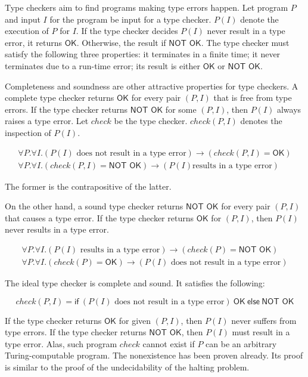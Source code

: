 Type checkers aim to find programs making type errors happen. Let program $P$ and
input $I$ for the program be input for a type checker. $P(I)$ denote the
execution of $P$ for $I$. If the type checker decides $P(I)$ never result in a
type error, it returns $\textsf{OK}$. Otherwise, the result if $\textsf{NOT OK}$.
The type checker must satisfy the following three properties: it terminates in a
finite time; it never terminates due to a run-time error; its result is either
$\textsf{OK}$ or $\textsf{NOT OK}$.

Completeness and soundness are other attractive properties for type checkers. A
complete type checker returns $\textsf{OK}$ for every pair $(P,I)$ that is free
from type errors. If the type checker returns $\textsf{NOT OK}$ for some $(P,I)$,
then $P(I)$ always raises a type error. Let $check$ be the type checker.
$check(P,I)$ denotes the inspection of $P(I)$.

\[
\begin{array}{l}
\forall P.\forall I.(P(I)\text{ does not result in a type
error})\rightarrow(\mathit{check}(P,I)=\textsf{OK}) \\
\forall P.\forall I.(\mathit{check}(P,I)=\textsf{NOT OK})\rightarrow(P(I)\text{
results in a type error})
\end{array}
\]

The former is the contrapositive of the latter.

On the other hand, a sound type checker returns $\textsf{NOT OK}$ for every pair
$(P,I)$ that causes a type error. If the type checker returns $\textsf{OK}$ for
$(P,I)$, then $P(I)$ never results in a type error.

\[
\begin{array}{l}
\forall P.\forall I.(P(I)\text{ results in a type
error})\rightarrow(\mathit{check}(P)=\textsf{NOT OK}) \\
\forall P.\forall I.(\mathit{check}(P)=\textsf{OK})\rightarrow(P(I)\text{ does
not result in a type error})
\end{array}
\]

The ideal type checker is complete and sound. It satisfies the following:

\[
\mathit{check}(P, I) =
\textsf{if}\ (P(I)\text{ does not result in a type error})\ \textsf{OK}\
\textsf{else}\ \textsf{NOT OK}
\]

If the type checker returns $\textsf{OK}$ for given $(P,I)$, then $P(I)$ never
suffers from type errors. If the type checker returns $\textsf{NOT OK}$, then
$P(I)$ must result in a type error. Alas, such program $check$ cannot exist if
$P$ can be an arbitrary Turing-computable program. The nonexistence has been
proven already. Its proof is similar to the proof of the undecidability of the
halting problem.


